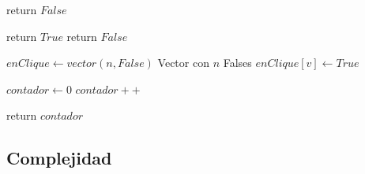 \begin{algorithm}[H]
\begin{algorithmic}
                \State return $False$
            \EndIf
        \EndFor
    \EndFor
\EndFunction
\end{algorithmic}
\end{algorithm}

\begin{algorithm}[H]
\begin{algorithmic}
            \State return $True$
        \EndIf
    \EndFor
    \State return $False$

\EndFunction
\end{algorithmic}
\end{algorithm}

\begin{algorithm}[H]
\begin{algorithmic}
    \State $enClique \gets vector(n, False)$ \Comment Vector con $n$ Falses
        \State $enClique[v] \gets True$
    \EndFor

    \State $contador \gets 0$
                \State $contador++$
            \EndIf
        \EndFor
    \EndFor

    \State return $contador$

\EndFunction
\end{algorithmic}
\end{algorithm}

\subsection{Complejidad}

